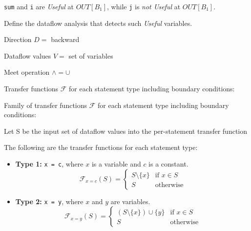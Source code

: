 \documentclass[12pt]{article}
\begin{document}
\begin{enumerate}

        \lstinline$sum$ and \lstinline$i$ are \emph{Useful} at $OUT[B_1]$,
      while \lstinline$j$ is \emph{not Useful} at $OUT[B_1]$.


      Define the dataflow analysis that detects such \emph{Useful} variables.

      \begin{mdframed}
        Direction $D =$ backward

        Dataflow values $V = $ set of variables

        Meet operation $\wedge = \cup$

        Transfer functions $\mathcal{F}$ for each statement type including boundary conditions:  %

        Family of transfer functions $\mathcal{F}$ for each statement type
        including boundary conditions:

        Let S be the input set of dataflow values into the per-statement transfer function

        The following are the transfer functions for each statement type:

        \begin{itemize}

            \item \textbf{Type 1:} \texttt{x = c}, where $x$ is a variable and $c$ is a constant.
            \[
                \mathcal{F}_{x = c}(S) =
                \begin{cases}
                    S \setminus \{x\} & \text{if } x \in S \\
                    S & \text{otherwise}
                \end{cases}
            \]

            \item \textbf{Type 2:} \texttt{x = y}, where $x$ and $y$ are variables.
            \[
                \mathcal{F}_{x = y}(S) =
                \begin{cases}
                    (S \setminus \{x\}) \cup \{y\} & \text{if } x \in S \\
                    S & \text{otherwise}
                \end{cases}
            \]


\end{itemize}
\end{mdframed}
\end{enumerate}
\end{document}
